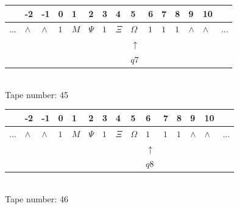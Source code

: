 \documentclass[11pt]{article}
\begin{document}
\begin{table}[H]
\centering
\begin{tabular}{lllllllllllllll}
 & -2 & -1 & 0 & 1 & 2 & 3 & 4 & 5 & 6 & 7 & 8 & 9 & 10 & \\
\hline
$...$ & \multicolumn{1}{|l|}{$\wedge$} & \multicolumn{1}{|l|}{$\wedge$} & \multicolumn{1}{|l|}{$1$} & \multicolumn{1}{|l|}{$M$} & \multicolumn{1}{|l|}{$\Psi$} & \multicolumn{1}{|l|}{$1$} & \multicolumn{1}{|l|}{$\Xi$} & \multicolumn{1}{|l|}{$\Omega$} & \multicolumn{1}{|l|}{$1$} & \multicolumn{1}{|l|}{$1$} & \multicolumn{1}{|l|}{$1$} & \multicolumn{1}{|l|}{$\wedge$} & \multicolumn{1}{|l|}{$\wedge$} & $...$\\
\hline
&  &  &  &  &  &  &  & $\uparrow$ &  &  &  &  &  &  \\
&  &  &  &  &  &  &  & $ q7 $ &  &  &  &  &  &  \\
\end{tabular}
\\
Tape number: 45
\noindent\makebox[\linewidth]{\hdashrule{\textwidth}{1pt}{1pt}}\end{table}

\begin{table}[H]
\centering
\begin{tabular}{lllllllllllllll}
 & -2 & -1 & 0 & 1 & 2 & 3 & 4 & 5 & 6 & 7 & 8 & 9 & 10 & \\
\hline
$...$ & \multicolumn{1}{|l|}{$\wedge$} & \multicolumn{1}{|l|}{$\wedge$} & \multicolumn{1}{|l|}{$1$} & \multicolumn{1}{|l|}{$M$} & \multicolumn{1}{|l|}{$\Psi$} & \multicolumn{1}{|l|}{$1$} & \multicolumn{1}{|l|}{$\Xi$} & \multicolumn{1}{|l|}{$\Omega$} & \multicolumn{1}{|l|}{$1$} & \multicolumn{1}{|l|}{$1$} & \multicolumn{1}{|l|}{$1$} & \multicolumn{1}{|l|}{$\wedge$} & \multicolumn{1}{|l|}{$\wedge$} & $...$\\
\hline
&  &  &  &  &  &  &  &  & $\uparrow$ &  &  &  &  &  \\
&  &  &  &  &  &  &  &  & $ q8 $ &  &  &  &  &  \\
\end{tabular}
\\
Tape number: 46
\noindent\makebox[\linewidth]{\hdashrule{\textwidth}{1pt}{1pt}}\end{table}
\end{document}
